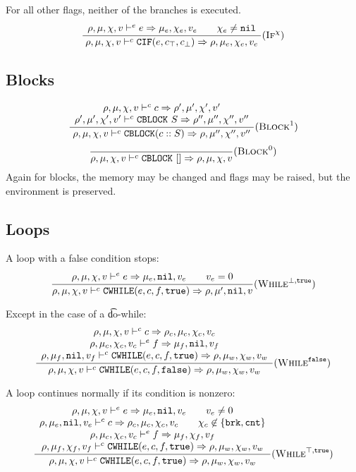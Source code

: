 For all other flags, neither of the branches is executed.
\[\dfrac{\begin{array}{c}
\rho,\mu,\chi,v \vdash^e e \Rightarrow \mu_e,\chi_e,v_e \qquad \chi_e\ne\texttt{nil} \\
\end{array}}{\rho,\mu,\chi,v \vdash^c \texttt{CIF}(e, c_\top, c_\bot) \Rightarrow \rho,\mu_e,\chi_e,v_e} (\textsc{If}^\chi)\]

\subsection{Blocks}
\[\dfrac{\begin{array}{c}
    \rho,\mu,\chi,v \vdash^c c \Rightarrow \rho',\mu',\chi',v' \\
    \rho',\mu',\chi',v' \vdash^c \texttt{CBLOCK}\ S \Rightarrow \rho'',\mu'',\chi'',v''
\end{array}}{\rho,\mu,\chi,v \vdash^c \texttt{CBLOCK}(c :: S) \Rightarrow \rho,\mu'',\chi'',v''} (\textsc{Block}^1)\]
\[\dfrac{}{\rho,\mu,\chi,v \vdash^c \texttt{CBLOCK}\ [] \Rightarrow \rho,\mu,\chi,v} (\textsc{Block}^0)\]
Again for blocks, the memory may be changed and flags may be raised, but the environment is preserved.\\

\subsection{Loops}

A loop with a false condition stops:
\[\dfrac{\begin{array}{c}
    \rho,\mu,\chi,v \vdash^e e \Rightarrow \mu_e,\texttt{nil},v_e \qquad v_e = 0 \\
\end{array}}{\rho,\mu,\chi,v \vdash^c \texttt{CWHILE}(e, c, f, \texttt{true}) \Rightarrow \rho,\mu',\texttt{nil},v} (\textsc{While}^{\bot,\texttt{true}})\]

Except in the case of a \t{do-while}:
\[\dfrac{\begin{array}{c}
    \rho,\mu,\chi,v \vdash^c c \Rightarrow \rho_c,\mu_c,\chi_c,v_c \\
    \rho,\mu_c,\chi_c,v_c \vdash^e f \Rightarrow \mu_f,\texttt{nil},v_f \\
    \rho,\mu_f,\texttt{nil},v_f \vdash^c \texttt{CWHILE}(e, c, f, \texttt{true}) \Rightarrow \rho,\mu_w,\chi_w,v_w
\end{array}}{\rho,\mu,\chi,v \vdash^c \texttt{CWHILE}(e, c, f, \texttt{false}) \Rightarrow \rho,\mu_w,\chi_w,v_w} (\textsc{While}^{\texttt{false}})\]

A loop continues normally if its condition is nonzero:
\[\dfrac{\begin{array}{c}
    \rho,\mu,\chi,v \vdash^e e \Rightarrow \mu_e,\texttt{nil},v_e \qquad v_e \ne 0 \\
    \rho,\mu_e,\texttt{nil},v_e \vdash^c c \Rightarrow \rho_c,\mu_c,\chi_c,v_c \qquad \chi_c\not\in\{ \texttt{brk}, \texttt{cnt} \} \\
    \rho,\mu_c,\chi_c,v_c \vdash^e f \Rightarrow \mu_f,\chi_f,v_f \\
    \rho,\mu_f,\chi_f,v_f \vdash^c \texttt{CWHILE}(e, c, f, \texttt{true}) \Rightarrow \rho,\mu_w,\chi_w,v_w
\end{array}}{\rho,\mu,\chi,v \vdash^c \texttt{CWHILE}(e, c, f, \texttt{true}) \Rightarrow \rho,\mu_w,\chi_w,v_w} (\textsc{While}^{\top,\texttt{true}})\]

